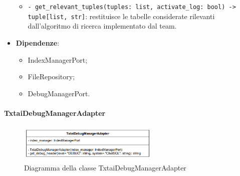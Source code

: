 \begin{itemize}
\begin{itemize}
        \item \texttt{- get\_relevant\_tuples(tuples: list, activate\_log: bool) -> tuple[list, str]}: restituisce le tabelle considerate rilevanti dall'algoritmo di ricerca implementato dal team.
    \end{itemize}
    \item \textbf{Dipendenze}:
    \begin{itemize}
        \item IndexManagerPort;
        \item FileRepository;
        \item DebugManagerPort.
    \end{itemize}
\end{itemize} 

\paragraph{TxtaiDebugManagerAdapter} \label{TxtaiDebugManagerAdapter}
\begin{figure}[H]
    \centering
    \includegraphics[width=0.6\textwidth]{assets/Backend/txtai_debug_manager_adapter.png}
    \caption{Diagramma della classe TxtaiDebugManagerAdapter}
  \end{figure}
